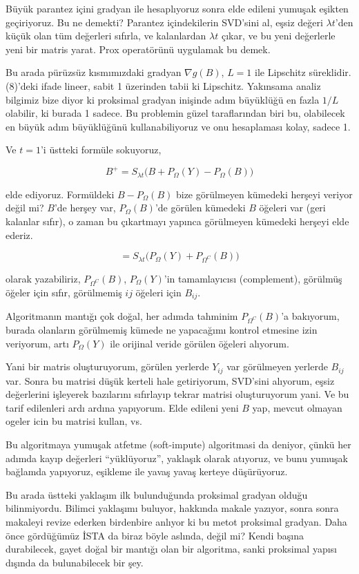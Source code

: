 \documentclass[12pt,fleqn]{article}\usepackage{../../common}
\begin{document}
Büyük parantez içini gradyan ile hesaplıyoruz sonra elde edileni yumuşak
eşikten geçiriyoruz. Bu ne demekti? Parantez içindekilerin SVD'sini al,
eşsiz değeri $\lambda t$'den küçük olan tüm değerleri sıfırla, ve
kalanlardan $\lambda t$ çıkar, ve bu yeni değerlerle yeni bir matris
yarat. Prox operatörünü uygulamak bu demek.

Bu arada pürüzsüz kısmımızdaki gradyan $\nabla g(B)$, $L=1$ ile Lipschitz
süreklidir. (8)'deki ifade lineer, sabit 1 üzerinden tabii ki
Lipschitz. Yakınsama analiz bilgimiz bize diyor ki proksimal gradyan
inişinde adım büyüklüğü en fazla $1/L$ olabilir, ki burada 1 sadece. Bu
problemin güzel taraflarından biri bu, olabilecek en büyük adım büyüklüğünü
kullanabiliyoruz ve onu hesaplaması kolay, sadece 1.

Ve $t=1$'i üstteki formüle sokuyoruz, 

$$
B^+ = S_{\lambda t} \bigg( B + P_\Omega(Y) - P_\Omega(B)  \bigg)
$$

elde ediyoruz. Formüldeki $B - P_\Omega(B)$  bize görülmeyen kümedeki
herşeyi veriyor değil mi? $B$'de herşey var, $P_\Omega(B)$'de görülen
kümedeki $B$ öğeleri var (geri kalanlar sıfır), o zaman bu çıkartmayı
yapınca görülmeyen kümedeki herşeyi elde ederiz. 

$$
= S_{\lambda t} \bigg( P_\Omega(Y) + P_{\Omega^C}(B) \bigg)
$$
  
olarak yazabiliriz, $P_{\Omega^C}(B)$, $P_{\Omega}(Y)$'in tamamlayıcısı
(complement), görülmüş öğeler için sıfır, görülmemiş $ij$ öğeleri için
$B_{ij}$.  

Algoritmanın mantığı çok doğal, her adımda tahminim $P_{\Omega^C}(B)$'a
bakıyorum, burada olanların görülmemiş kümede ne yapacağımı kontrol
etmesine izin veriyorum, artı $P_\Omega(Y)$ ile orijinal veride görülen
öğeleri alıyorum.

Yani bir matris oluşturuyorum, görülen yerlerde $Y_{ij}$ var görülmeyen
yerlerde $B_{ij}$ var. Sonra bu matrisi düşük kerteli hale getiriyorum,
SVD'sini alıyorum, eşsiz değerlerini işleyerek bazılarını sıfırlayıp tekrar
matrisi oluşturuyorum yani. Ve bu tarif edilenleri ardı ardına
yapıyorum. Elde edileni yeni $B$ yap, mevcut olmayan ogeler icin bu matrisi
kullan, vs. 

Bu algoritmaya yumuşak atfetme (soft-impute) algoritmasi da deniyor, çünkü
her adımda kayıp değerleri ``yüklüyoruz'',  yaklaşık olarak atıyoruz, ve
bunu yumuşak bağlamda yapıyoruz, eşikleme ile yavaş yavaş kerteye
düşürüyoruz. 

Bu arada üstteki yaklaşım ilk bulunduğunda proksimal gradyan olduğu
bilinmiyordu. Bilimci yaklaşımı buluyor, hakkında makale yazıyor, sonra
sonra makaleyi revize ederken birdenbire anlıyor ki bu metot proksimal
gradyan.  Daha önce gördüğümüz İSTA da biraz böyle aslında, değil mi? Kendi
başına durabilecek, gayet doğal bir mantığı olan bir algoritma, sanki
proksimal yapısı dışında da bulunabilecek bir şey.
\end{document}
